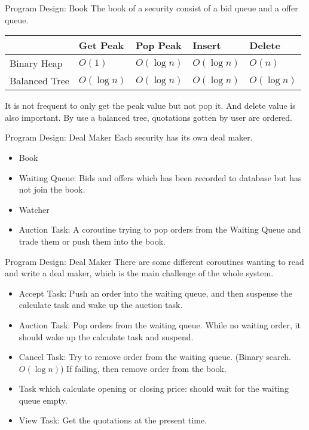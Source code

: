 \documentclass{beamer}
\begin{document}
\begin{frame}{Program Design: Book}
	The book of a security consist of a bid queue and a offer queue.
	\begin{table}[]
		\begin{tabular}{@{}lllll@{}}
			\toprule
			& Get Peak & Pop Peak & Insert   & Delete   \\ \midrule
			Binary Heap   & $O(1)$     & $O(\log n)$ & $O(\log n)$ & $O(n)$     \\
			Balanced Tree & $O(\log n)$ & $O(\log n)$ & $O(\log n)$ & $O(\log n)$ \\ \bottomrule
		\end{tabular}
	\end{table}
	It is not frequent to only get the peak value but not pop it. And delete value is also important.
	By use a balanced tree, quotations gotten by user are ordered.
\end{frame}
\begin{frame}{Program Design: Deal Maker}
	Each security has its own deal maker.
	\begin{itemize}
		\item Book
		\item Waiting Queue: Bids and offers which has been recorded to database but has not join the book.
		\item Watcher
		\item Auction Task: A coroutine trying to pop orders from the Waiting Queue and trade them or push them into the book.
	\end{itemize}
\end{frame}
\begin{frame}{Program Design: Deal Maker}
	There are some different coroutines wanting to read and write a deal maker, which is the main challenge of the whole system.
	\begin{itemize}
		\item Accept Task: Push an order into the waiting queue, and then suspense the calculate task and wake up the auction task.
		\item Auction Task: Pop orders from the waiting queue. While no waiting order, it should wake up the calculate task and suspend.
		\item Cancel Task: Try to remove order from the waiting queue. (Binary search. $O(\log n)$) If failing, then remove order from the book.
		\item Task which calculate opening or closing price: should wait for the waiting queue empty.
		\item View Task: Get the quotations at the present time.
	\end{itemize}
\end{frame}
\end{document}
